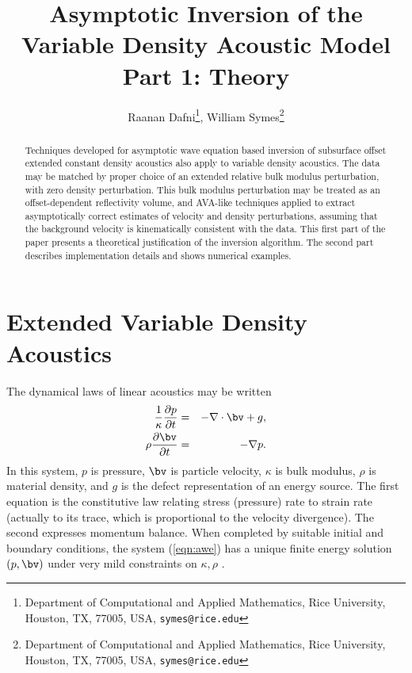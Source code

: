 \title{Asymptotic Inversion of the Variable Density Acoustic
  Model\\Part 1: Theory}

\author{
Raanan Dafni\thanks{Department of Computational and Applied Mathematics, Rice University, 
Houston, TX, 77005, USA, 
{\tt symes@rice.edu}},
William Symes\thanks{Department of Computational and Applied Mathematics, Rice University, 
Houston, TX, 77005, USA, 
{\tt symes@rice.edu}}
}



\maketitle
\parskip 12pt

\begin{abstract}
Techniques developed for asymptotic wave equation based inversion of
subsurface offset extended constant density acoustics also apply to variable density
acoustics. The data may be matched by proper choice of an extended
relative bulk modulus perturbation, with zero density
perturbation. This bulk modulus perturbation may be treated as an
offset-dependent reflectivity volume, and AVA-like techniques applied
to extract asymptotically correct estimates of velocity and density
perturbations, assuming that the background velocity is kinematically
consistent with the data. This first part of the paper presents a 
theoretical justification of the inversion algorithm. The second part
describes implementation details and shows numerical examples.
\end{abstract}
\setlength{\parindent}{0cm}
\section{Extended Variable Density Acoustics}
The dynamical laws of linear acoustics may be written
\begin{eqnarray}
\label{eqn:awe}
\frac{1}{\kappa}\frac{\partial p}{\partial t}& =& -\nabla \cdot \bv +
g,\nonumber \\
\rho \frac{\partial \bv}{\partial t} & = & -\nabla p.
\end{eqnarray}
In this system, $p$ is pressure, $\bv$ is particle velocity, $\kappa$
is bulk modulus, $\rho$ is material density, and $g$ is the defect
representation of an energy source. The first equation is the
constitutive law relating stress (pressure) rate to strain rate (actually to its
trace, which is proportional to the velocity divergence). The second
expresses momentum balance. When completed by suitable initial and
boundary conditions, the system (\ref{eqn:awe}) has a unique finite
energy solution $(p,\bv)$ under very mild constraints on $\kappa,
\rho$ \cite[]{BlazekStolkSymes:13}.

